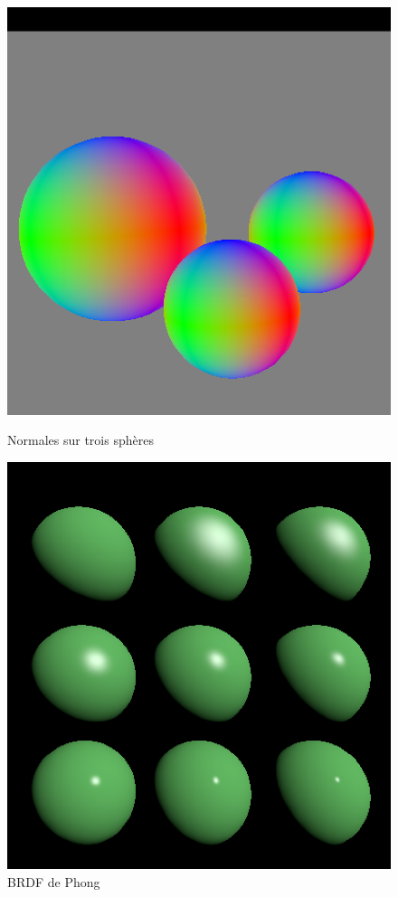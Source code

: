 \documentclass{article}
\begin{document}
\begin{figure}[htb!]
\centering
\begin{minipage}{.45\textwidth}
  \centering
  \includegraphics[width=\linewidth]{results/troisSpheres_normals.png}
  \caption{Normales sur trois sphères}
  \label{fig:tsnormal}
\end{minipage}\hfill
\begin{minipage}{.45\textwidth}
  \centering
  \includegraphics[width=\linewidth]{results/phong_direct.png}
  \caption{BRDF de Phong}
  \label{fig:phdirect}
\end{minipage}
\end{figure}
\end{document}
